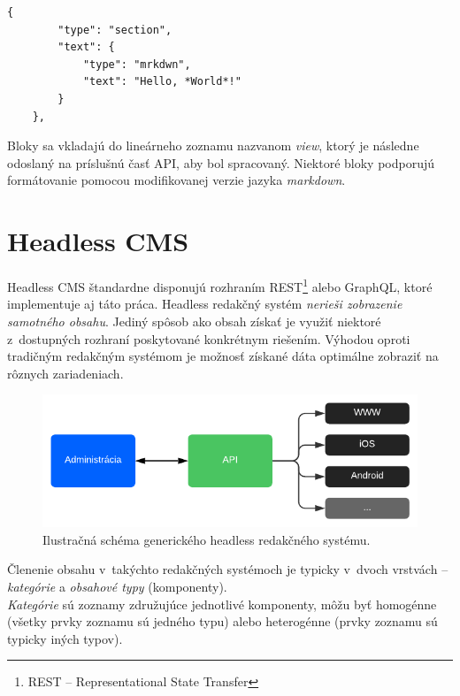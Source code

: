 \begin{lstlisting}[caption=Príklad jednoduchého bloku v~Slack aplikácií.]
	{
		"type": "section",
		"text": {
			"type": "mrkdwn",
			"text": "Hello, *World*!"
		}
	},
\end{lstlisting}

\bigskip

\noindent Bloky sa vkladajú do lineárneho zoznamu nazvanom \emph{view}, ktorý je následne odoslaný na príslušnú časť API, aby bol spracovaný. Niektoré bloky podporujú formátovanie pomocou modifikovanej verzie jazyka \emph{markdown}.

\chapter{Headless CMS}
\label{theory:headless}
Headless CMS štandardne disponujú rozhraním REST\footnote{REST -- Representational State Transfer} alebo GraphQL, ktoré implementuje aj táto práca. Headless redakčný systém \emph{nerieši zobrazenie samotného obsahu}. Jediný spôsob ako obsah získať je využiť niektoré z~dostupných rozhraní poskytované konkrétnym riešením. Výhodou oproti tradičným redakčným systémom je možnosť získané dáta optimálne zobraziť na rôznych zariadeniach. 

\begin{figure}[h]
	\centering
	\includegraphics{obrazky-figures/headless_cms_graph.pdf}
	\caption{Ilustračná schéma generického headless redakčného systému.}
\end{figure}

\noindent Členenie obsahu v~takýchto redakčných systémoch je typicky v~dvoch vrstvách -- \emph{kategórie} a \emph{obsahové typy} (komponenty). \\

\noindent \emph{Kategórie} sú zoznamy združujúce jednotlivé komponenty, môžu byť homogénne (všetky prvky zoznamu sú jedného typu) alebo heterogénne (prvky zoznamu sú typicky iných typov). \\

